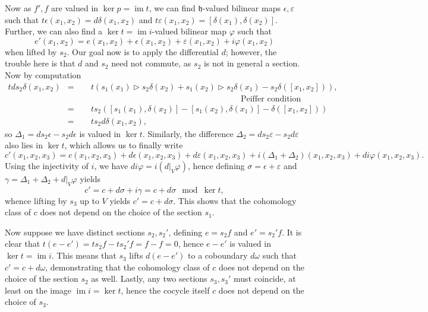 \documentclass[onecolumn]{article}
\theoremstyle{theorem}
\theoremstyle{remark}
\theoremstyle{example}
\theoremstyle{definition}
\numberwithin{equation}{section}
\begin{document}
Now as $f',f$ are valued in $\operatorname{ker}p=\operatorname{im}t$, we can find $\mathfrak{h}$-valued bilinear maps $\epsilon,\varepsilon$ such that $t\epsilon(x_1,x_2) = d\delta(x_1,x_2)$ and $t\varepsilon(x_1,x_2) = [\delta(x_1),\delta(x_2)]$. Further, we can also find a $\operatorname{ker}t=\operatorname{im}i$-valued bilinear map $\varphi$ such that 
\begin{equation}
    e'(x_1,x_2) = e(x_1,x_2) + \epsilon(x_1,x_2) + \varepsilon(x_1,x_2) + i\varphi(x_1,x_2)\nonumber
\end{equation}
when lifted by $s_2$. Our goal now is to apply the differential $d$; however, the trouble here is that $d$ and $s_2$ need not commute, as $s_2$ is not in general a section. Now by computation
\begin{eqnarray}
    tds_2\delta(x_1,x_2) &=& t(s_1(x_1)\rhd s_2\delta(x_2) + s_1(x_2)\rhd s_2\delta(x_1) - s_2\delta([x_1,x_2])),\nonumber\\
    &\qquad& \qquad\qquad\qquad\qquad\qquad\qquad\qquad\qquad\qquad \text{Peiffer condition}\nonumber \\
    &=& ts_2([s_1(x_1),\delta(x_2)]-[s_1(x_2),\delta(x_1)] - \delta([x_1,x_2]))\nonumber\\
    &=& ts_2d\delta(x_1,x_2),\nonumber
\end{eqnarray}
so $\Delta_1=ds_2\epsilon - s_2d\epsilon$ is valued in $\operatorname{ker}t$. Similarly, the difference $\Delta_2=ds_2\varepsilon - s_2d\varepsilon$ also lies in $\operatorname{ker}t$, which allows us to finally write 
\begin{equation}
    c'(x_1,x_2,x_3) = c(x_1,x_2,x_3) + d\epsilon(x_1,x_2,x_3) + d\varepsilon(x_1,x_2,x_3) + i\left(\Delta_1 + \Delta_2\right)(x_1,x_2,x_3) + di\varphi(x_1,x_2,x_3).\nonumber
\end{equation}
{Using} the injectivity of $i$, we have $di\varphi = i(d|_V \varphi)$, hence defining $\sigma=\epsilon+\varepsilon$ and $\gamma=\Delta_1+\Delta_2 +d|_V\varphi$ yields
\begin{equation}
    c' = c + d\sigma + i\gamma = c+d\sigma \mod\operatorname{ker}t,\nonumber
\end{equation}
whence lifting by $s_3$ up to $V$ yields $c'=c+d\sigma$. This shows that the cohomology class of $c$ does not depend on the choice of the section $s_1$.

Now suppose we have distinct sections $s_2,s_2'$, defining $e=s_2f$ and $e'=s_2'f$. It is clear that $t(e-e') = ts_2f-ts_2'f=f-f=0$, hence $e-e'$ is valued in $\operatorname{ker}t=\operatorname{im}i$. This means that $s_3$ lifts $d(e-e')$ to a coboundary $d\omega$ such that $c'=c+d\omega$, demonstrating that the cohomology class of $c$ does not depend on the choice of the section $s_2$ as well. Lastly, any two sections $s_3,s_3'$ must coincide, at least on the image $\operatorname{im}i=\operatorname{ker}t$, hence the { {cocycle itself}} $c$ does not depend on the choice of $s_3$.
\end{document}

